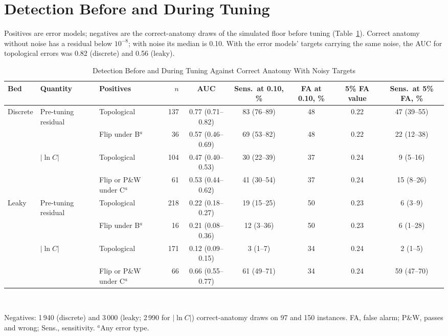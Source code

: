 \documentclass[journal,twoside,web,onecolumn]{ieeecolor}
\begin{document}
\FloatBarrier
{}
\section{Detection Before and During Tuning}\label{sec:detector}
Positives are error models; negatives are the correct-anatomy draws of the simulated floor before tuning
(Table~\ref{tab:detector}). Correct anatomy without noise has a residual below $10^{-8}$; with noise its median is
0.10. With the error models' targets carrying the same noise, the AUC for topological errors was 0.82 (discrete) and
0.56 (leaky).
\begin{table}[!ht]
\caption{Detection Before and During Tuning Against Correct Anatomy With Noisy Targets}\label{tab:detector}
\centering\footnotesize\setlength{\tabcolsep}{4pt}
\begin{tabular}{@{}lllrccccc@{}}
\toprule
Bed & Quantity & Positives & $n$ & AUC & Sens.\ at 0.10, \% & FA at 0.10, \% & 5\% FA value & Sens.\ at 5\% FA, \%\\
\midrule
Discrete & Pre-tuning residual & Topological & 137 & 0.77 (0.71--0.82) & 83 (76--89) & 48 & 0.22 & 47 (39--55) \\
 &  & Flip under B$^a$ & 36 & 0.57 (0.46--0.69) & 69 (53--82) & 48 & 0.22 & 22 (12--38) \\
 & $|\ln C|$ & Topological & 104 & 0.47 (0.40--0.53) & 30 (22--39) & 37 & 0.24 & 9 (5--16) \\
 &  & Flip or P\&W under C$^a$ & 61 & 0.53 (0.44--0.62) & 41 (30--54) & 37 & 0.24 & 15 (8--26) \\
\addlinespace[2pt]
Leaky & Pre-tuning residual & Topological & 218 & 0.22 (0.18--0.27) & 19 (15--25) & 50 & 0.23 & 6 (3--9) \\
 &  & Flip under B$^a$ & 16 & 0.21 (0.08--0.36) & 12 (3--36) & 50 & 0.23 & 6 (1--28) \\
 & $|\ln C|$ & Topological & 171 & 0.12 (0.09--0.15) & 3 (1--7) & 34 & 0.24 & 2 (1--5) \\
 &  & Flip or P\&W under C$^a$ & 66 & 0.66 (0.55--0.77) & 61 (49--71) & 34 & 0.24 & 59 (47--70) \\
\bottomrule
\end{tabular}
\\[3pt]
\parbox{0.9\textwidth}{\footnotesize Negatives: 1\,940 (discrete) and 3\,000 (leaky; 2\,990 for $|\ln C|$) correct-anatomy draws on 97 and 150 instances. FA, false alarm; P\&W, passes and wrong; Sens., sensitivity. $^a$Any error type.}
\end{table}
\end{document}
